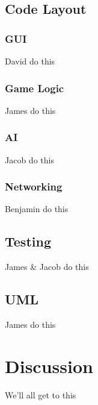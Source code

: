 \documentclass{article}
\begin{document}
\subsection{Code Layout}

\subsubsection{GUI}
David do this

\subsubsection{Game Logic}
James do this

\subsubsection{AI}
Jacob do this

\subsubsection{Networking}
Benjamin do this

\subsection{Testing}
James \& Jacob do this

\subsection{UML}
James do this

\section{Discussion}
We'll all get to this
\end{document}
